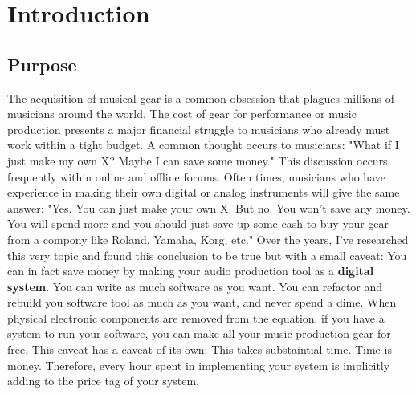 \documentclass[acmlarge,screen]{acmart}
\begin{document}

\maketitle

\section{Introduction}
\subsection{Purpose}
	The acquisition of musical gear is a common obsession that plagues millions of musicians around the world. The cost of gear for performance or music production presents a major financial struggle to musicians who already must work within a tight budget. A common thought occurs to musicians: "What if I just make my own X? Maybe I can save some money." This discussion occurs frequently within online and offline forums. Often times, musicians who have experience in making their own digital or analog instruments will give the same answer: "Yes. You can just make your own X. But no. You won't save any money. You will spend more and you should just save up some cash to buy your gear from a compony like Roland, Yamaha, Korg, etc." Over the years, I've researched this very topic and found this conclusion to be true but with a small caveat: You can in fact save money by making your audio production tool as a \textbf{digital system}. You can write as much software as you want. You can refactor and rebuild you software tool as much as you want, and never spend a dime. When physical electronic components are removed from the equation, if you have a system to run your software, you can make all your music production gear for free. This caveat has a caveat of its own: This takes substaintial time. Time is money. Therefore, every hour spent in implementing your system is implicitly adding to the price tag of your system.
	
\end{document}
